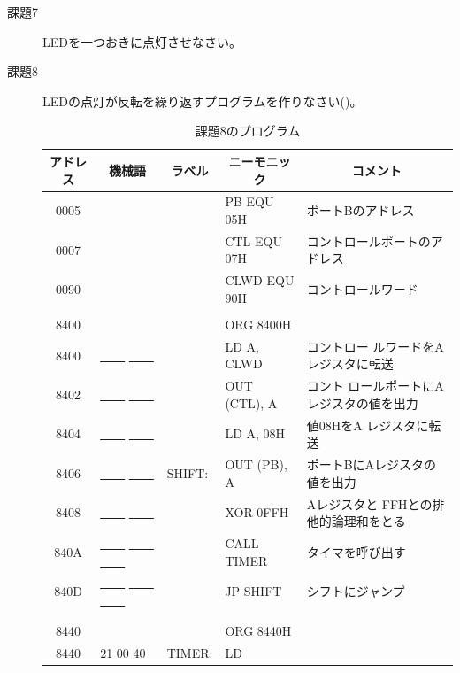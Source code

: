 \begin{description}
\item[課題7] LEDを一つおきに点灯させなさい。

\item[課題8] LEDの点灯が反転を繰り返すプログラムを作りなさい()。

\begin{table}
\begin{center}
\caption{課題8のプログラム}
\label{tab:q1-8}
\small
\begin{tabular}{|c|l|ll|l|}
\hline
アドレス& \multicolumn{1}{|c|}{機械語}&\multicolumn{1}{|c}{ラベル}&\multicolumn{1}{c|}{ニーモニック}&\multicolumn{1}{|c|}{コメント}\\
\hline
   0005 &            &    &PB EQU 05H& ポートBのアドレス\\
   0007 &            &    &CTL EQU 07H& コントロールポートのアドレス\\
   0090 &            &    &CLWD EQU 90H& コントロールワード\\
        &            &    &&\\
   8400 &            &    &    ORG 8400H&\\
   8400 &  \underline{~~~~} \underline{~~~~}     &    &    LD A, CLWD& コントロー
                    ルワードをAレジスタに転送\\
   8402 &  \underline{~~~~} \underline{~~~~}     &    &    OUT (CTL), A& コント
                    ロールポートにAレジスタの値を出力\\
   8404 &  \underline{~~~~} \underline{~~~~}      &    &    LD A, 08H& 値08HをA
                    レジスタに転送\\
   8406 &  \underline{~~~~} \underline{~~~~}      &    SHIFT:&     OUT (PB), A&
                    ポートBにAレジスタの値を出力\\
   8408 &  \underline{~~~~} \underline{~~~~}     &        &XOR 0FFH& Aレジスタと
                    FFHとの排他的論理和をとる\\
   840A &  \underline{~~~~} \underline{~~~~} \underline{~~~~}   &        &CALL
                TIMER& タイマを呼び出す\\
   840D &  \underline{~~~~} \underline{~~~~} \underline{~~~~}   &        &JP
                SHIFT& シフトにジャンプ\\
        &            &    &&\\
        &            &    &&\\
   8440 &            &    &    ORG 8440H&\\
   8440 &  21 00 40   &    TIMER:& LD

\end{tabular}
\end{center}
\end{table}
\end{description}
